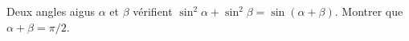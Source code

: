 Deux angles aigus $\alpha$ et $\beta$ vérifient $\sin^2\alpha + \sin^2\beta = \sin(\alpha + \beta)$. Montrer que $\alpha + \beta = \pi/2$.
